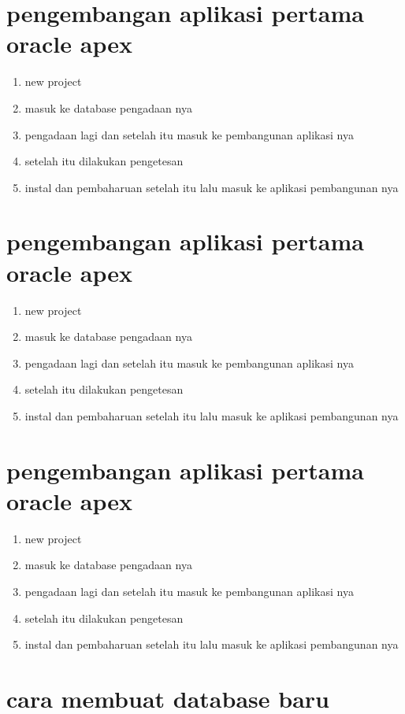\documentclass{article}
\begin{document}
\section{pengembangan aplikasi pertama oracle apex}

\begin{enumerate}
\item new project
\item masuk ke database pengadaan nya
\item pengadaan lagi dan setelah itu masuk ke pembangunan aplikasi nya
\item  setelah itu dilakukan pengetesan
\item  instal dan pembaharuan setelah itu lalu masuk ke aplikasi pembangunan nya
\end{enumerate}

\section{pengembangan aplikasi pertama oracle apex}

\begin{enumerate}
\item new project
\item masuk ke database pengadaan nya
\item pengadaan lagi dan setelah itu masuk ke pembangunan aplikasi nya
\item  setelah itu dilakukan pengetesan
\item  instal dan pembaharuan setelah itu lalu masuk ke aplikasi pembangunan nya
\end{enumerate}

\section{pengembangan aplikasi pertama oracle apex}

\begin{enumerate}
\item new project
\item masuk ke database pengadaan nya
\item pengadaan lagi dan setelah itu masuk ke pembangunan aplikasi nya
\item  setelah itu dilakukan pengetesan
\item  instal dan pembaharuan setelah itu lalu masuk ke aplikasi pembangunan nya
\end{enumerate}

\section{cara membuat database baru }
\end{document}
